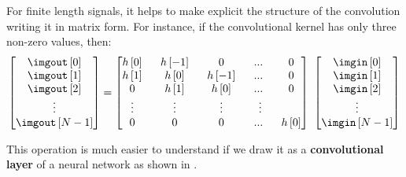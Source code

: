 For finite length signals, it helps to make explicit the structure of the convolution writing it in matrix form. For instance, if the convolutional kernel has only three non-zero values, then:
\begin{equation}
\begin{bmatrix}
\imgout \left[ 0 \right] \\
\imgout \left[ 1 \right] \\
\imgout \left[ 2 \right] \\
\vdots \\
\imgout \left[ N-1 \right]
\end{bmatrix}
 =
\begin{bmatrix}
  h\left[0\right] ~&~ h\left[-1\right] ~&~ 0 ~&~ ... ~&~ 0 \\
  h\left[1\right] ~&~ h\left[0\right] ~&~ h\left[-1\right] ~&~... ~&~ 0 \\
  0 ~&~ h\left[1\right] ~&~ h\left[0\right] ~&~... ~&~ 0 \\
  \vdots ~&~  \vdots ~&~  \vdots ~&~  \vdots \\
  0 ~&~ 0 ~&~ 0 ~&~... ~&~ h\left[0\right] 
 \end{bmatrix}
~
 \begin{bmatrix}
  \imgin \left[0\right] \\
  \imgin \left[1\right] \\
  \imgin \left[2\right] \\
  \vdots \\
  \imgin \left[N-1\right]
 \end{bmatrix}
\end{equation}

This operation is much easier to understand if we draw it as a {\bf convolutional layer} of a neural network as shown in \fig{\ref{fig:conv_filter2_nn}}.

